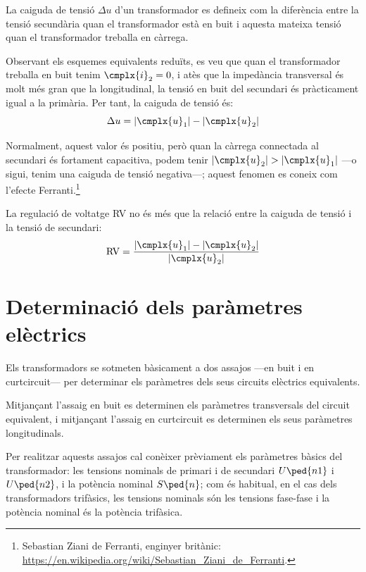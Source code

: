 La caiguda de tensió $\Delta u$ d'un transformador  es defineix com la diferència entre la tensió secundària quan el transformador està en buit i aquesta mateixa tensió quan el transformador treballa en càrrega.

Observant els esquemes equivalents reduïts, es veu que quan el transformador treballa en buit tenim $\cmplx{i}_2=0$, i atès que la impedància transversal és molt més gran que la longitudinal, la tensió en buit del secundari és pràcticament igual a la primària. Per tant, la caiguda de tensió és:
\begin{equation}
    \Delta u = |\cmplx{u}_1| - |\cmplx{u}_2|
\end{equation}

Normalment, aquest valor és positiu, però quan la càrrega connectada al secundari és fortament capacitiva, podem tenir  $|\cmplx{u}_2| > |\cmplx{u}_1|$ ---o sigui, tenim una caiguda de tensió negativa---; aquest fenomen  es coneix com l'efecte Ferranti.\footnote{Sebastian Ziani de Ferranti, enginyer britànic: \href{https://en.wikipedia.org/wiki/Sebastian_Ziani_de_Ferranti}{https:/\!\!/en.wikipedia.org/wiki/Sebastian\_Ziani\_de\_Ferranti}.}

La regulació de voltatge RV no és més que la relació entre la caiguda de tensió i la tensió de secundari:
\begin{equation}
    \text{RV} = \frac{|\cmplx{u}_1| - |\cmplx{u}_2|}{|\cmplx{u}_2|}
\end{equation}

\section{Determinació dels paràmetres elèctrics}\label{sec:determ-param-trafo}

Els transformadors se sotmeten bàsicament a dos assajos ---en
buit i en curtcircuit--- per determinar els paràmetres
dels seus circuits elèctrics equivalents.

Mitjançant l'assaig en buit es determinen els paràmetres
transversals del circuit equivalent, i mitjançant l'assaig en curtcircuit es determinen els seus paràmetres longitudinals.

Per  realitzar aquests assajos cal conèixer prèviament els paràmetres
bàsics del transformador: les tensions nominals de primari i de
secundari $U\ped{n1}$ i $U\ped{n2}$, i la potència nominal
$S\ped{n}$; com és habitual, en el cas dels transformadors
trifàsics, les tensions nominals són les tensions fase-fase i la
potència nominal és la potència trifàsica.

